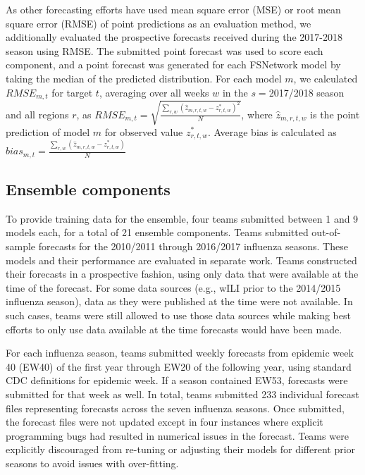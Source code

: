 \documentclass{article}\usepackage[]{graphicx}\usepackage[]{color}
\begin{document}
As other forecasting efforts have used mean square error (MSE) or root mean square error (RMSE) of point predictions as an evaluation method, we additionally evaluated the prospective forecasts received during the 2017-2018 season using RMSE. The submitted point forecast was used to score each component, and a point forecast was generated for each FSNetwork model by taking the median of the predicted distribution. For each model $m$, we calculated $RMSE_{m,t}$ for target $t$, averaging over all weeks $w$ in the $s=$2017/2018 season and all regions $r$, as $RMSE_{m,t} = \sqrt{\frac{\sum_{r,w}(\hat z_{m,r,t,w} - z^*_{r,t,w})^2}{N}}$, where $\hat z_{m,r,t,w}$ is the point prediction of model $m$ for observed value $z^*_{r,t,w}$. Average bias is calculated as $bias_{m,t} = \frac{\sum_{r,w}(\hat z_{m,r,t,w} - z^*_{r,t,w})}{N}$

\subsection*{Ensemble components}
To provide training data for the ensemble, four teams submitted between 1 and 9 models each, for a total of 21 ensemble components. Teams submitted out-of-sample forecasts for the 2010/2011 through 2016/2017 influenza seasons. These models and their performance are evaluated in separate work.\cite{reich2019collaborative} Teams constructed their forecasts in a prospective fashion, using only data that were available at the time of the forecast. For some data sources (e.g., wILI prior to the 2014/2015 influenza season), data as they were published at the time were not available. In such cases, teams were still allowed to use those data sources while making best efforts to only use data available at the time forecasts would have been made.

For each influenza season, teams submitted weekly forecasts from epidemic week 40 (EW40) of the first year through EW20 of the following year, using standard CDC definitions for epidemic week.\cite{NewMexicoDepartmentofHealth,Niemi2015,Tushar2018} If a season contained EW53, forecasts were submitted for that week as well. In total, teams submitted 233 individual forecast files representing forecasts across the seven influenza seasons. Once submitted, the forecast files were not updated except in four instances where explicit programming bugs had resulted in numerical issues in the forecast. Teams were explicitly discouraged from re-tuning or adjusting their models for different prior seasons to avoid issues with over-fitting.
\end{document}
